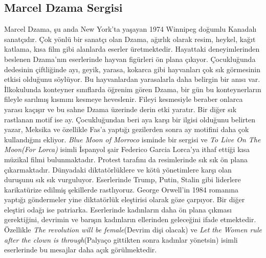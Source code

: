 \subsection{Marcel Dzama Sergisi}
\indent\indent Marcel Dzama, şu anda New York'ta yaşayan 1974 Winnipeg doğumlu Kanadalı sanatçıdır. Çok yönlü bir sanatçı olan Dzama, ağırlık olarak resim, heykel, kağıt katlama, kısa film gibi alanlarda eserler üretmektedir.\newline
\indent Hayattaki deneyimlerinden beslenen Dzama'nın eserlerinde hayvan figürleri ön plana çıkıyor. Çocukluğunda dedesinin çiftliğinde ayı, geyik, yarasa, kokarca gibi hayvanları çok sık görmesinin etkisi olduğunu söylüyor. Bu hayvanlardan yarasalarla daha belirgin bir anısı var. İlkokulunda konteyner sınıflarda öğrenim gören Dzama, bir gün bu konteynerların fileyle sarılmış kısmını kesmeye heveslenir. Fileyi kesmesiyle beraber onlarca yarası kaçışır ve bu sahne Dzama üzerinde derin etki yaratır.\newline
\indent Bir diğer sık rastlanan motif ise ay. Çocukluğundan beri aya karşı bir ilgisi olduğunu belirten yazar, Meksika ve özellikle Fas'a yaptığı gezilerden sonra ay motifini daha çok kullandığını ekliyor. \textit{Blue Moon of Morroco} isminde bir sergisi ve \textit{To Live On The Moon(For Lorca)} isimli İspanyol şair Federico Garcia Lorca'ya ithaf ettiği kısa müzikal filmi bulunmaktadır.\newline
\indent Protest tarafını da resimlerinde sık sık ön plana çıkarmaktadır. Dünyadaki diktatörlüklere ve kötü yönetimlere karşı olan duruşunu sık sık vurguluyor. Eserlerinde Trump, Putin, Stalin gibi liderlere karikatürize edilmiş şekillerde rastlıyoruz. George Orwell'in 1984 romanına yaptığı göndermeler yine diktatörlük eleştirisi olarak göze çarpıyor.\newline
\indent Bir diğer eleştiri odağı ise patriarka. Eserlerinde kadınların daha ön plana çıkması gerektiğini, devrimin ve barışın kadınların ellerinden geleceğini ifade etmektedir. Özellikle \textit{The revolution will be female}(Devrim dişi olacak) ve \textit{Let the Women rule after the clown is through}(Palyaço gittikten sonra kadınlar yönetsin) isimli eserlerinde bu mesajlar daha açık görülmektedir.\newline
